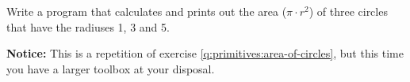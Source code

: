 Write a program that calculates and prints out the area ($\pi \cdot r^2$) of three circles that have the radiuses 1, 3 and 5.

\textbf{Notice:} This is a repetition of exercise \ref{q:primitives:area-of-circles}, but this time you have a larger toolbox at your disposal.
